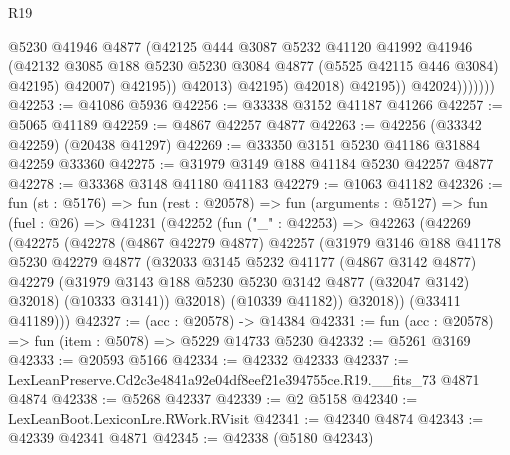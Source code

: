 \begin{lexlean}{R19}
\begin{coremodule}
                                @5230
                                @41946
                                @4877
                                (@42125
                                  @444
                                  @3087
                                  @5232
                                  @41120
                                  @41992
                                  @41946
                                  (@42132
                                    @3085
                                    @188
                                    @5230
                                    @5230
                                    @3084
                                    @4877
                                    (@5525 @42115 @446 @3084)
                                    @42195)
                                  @42007)
                                @42195))
                            @42013)
                          @42195)
                        @42018)
                      @42195))
                  @42024)))))))
@42253 := @41086 @5936
@42256 := @33338 @3152 @41187 @41266
@42257 := @5065 @41189
@42259 := @4867 @42257 @4877
@42263 := @42256 (@33342 @42259) (@20438 @41297)
@42269 := @33350 @3151 @5230 @41186 @31884 @42259 @33360
@42275 := @31979 @3149 @188 @41184 @5230 @42257 @4877
@42278 := @33368 @3148 @41180 @41183
@42279 := @1063 @41182
@42326 := fun (st : @5176) =>
  fun (rest : @20578) =>
  fun (arguments : @5127) =>
  fun (fuel : @26) =>
  @41231
    (@42252
      (fun ("_" : @42253) =>
      @42263
        (@42269
          (@42275
            (@42278
              (@4867 @42279 @4877)
              @42257
              (@31979
                @3146
                @188
                @41178
                @5230
                @42279
                @4877
                (@32033
                  @3145
                  @5232
                  @41177
                  (@4867 @3142 @4877)
                  @42279
                  (@31979 @3143 @188 @5230 @5230 @3142 @4877 (@32047 @3142) @32018)
                  (@10333 @3141))
                @32018)
              (@10339 @41182))
            @32018))
        (@33411 @41189)))
@42327 := (acc : @20578) -> @14384
@42331 := fun (acc : @20578) => fun (item : @5078) => @5229 @14733 @5230
@42332 := @5261 @3169
@42333 := @20593 @5166
@42334 := @42332 @42333
@42337 := LexLeanPreserve.Cd2c3e4841a92e04df8eef21e394755ce.R19.__fits_73 @4871 @4874
@42338 := @5268 @42337
@42339 := @2 @5158
@42340 := LexLeanBoot.LexiconLre.RWork.RVisit
@42341 := @42340 @4874
@42343 := @42339 @42341 @4871
@42345 := @42338 (@5180 @42343)

\end{coremodule}
\end{lexlean}
